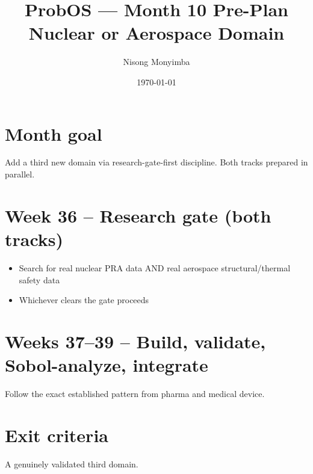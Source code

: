 \documentclass[11pt]{article}
\title{ProbOS --- Month 10 Pre-Plan\\Nuclear or Aerospace Domain}
\author{Nisong Monyimba}
\date{\today}
\begin{document}
\maketitle

\section*{Month goal}
Add a third new domain via research-gate-first discipline. Both
tracks prepared in parallel.

\section*{Week 36 -- Research gate (both tracks)}
\begin{itemize}[leftmargin=*]
  \item Search for real nuclear PRA data AND real aerospace
    structural/thermal safety data
  \item Whichever clears the gate proceeds
\end{itemize}

\section*{Weeks 37--39 -- Build, validate, Sobol-analyze, integrate}
Follow the exact established pattern from pharma and medical device.

\section*{Exit criteria}
A genuinely validated third domain.
\end{document}
